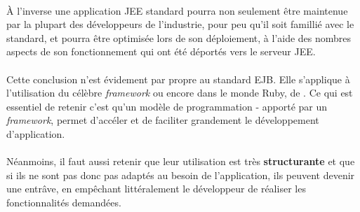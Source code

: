 {  \paragraph{} À l'inverse une application JEE standard pourra non seulement être maintenue par la
  plupart des développeurs de l'industrie, pour peu qu'il soit famillié avec le standard, et pourra
  être optimisée lors de son déploiement, à l'aide des nombres aspects de son fonctionnement qui ont
  été déportés vers le serveur JEE.

  \paragraph{} Cette conclusion n'est évidement par propre au standard EJB. Elle s'applique à
  l'utilisation du célèbre \textit{framework}  ou encore dans le monde Ruby, de
  . Ce qui est essentiel de retenir c'est qu'un modèle de programmation
  - apporté par un \textit{framework}, permet d'accéler et de faciliter grandement le développement
  d'application.

  \paragraph{} Néanmoins, il faut aussi retenir que leur utilisation est très \textbf{structurante}
  et que si ils ne sont pas donc pas adaptés au besoin de l'application, ils peuvent devenir une
  entrâve, en empêchant littéralement le développeur de réaliser les fonctionnalités demandées.
}
